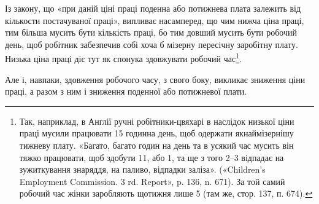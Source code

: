 Із закону, що «при даній ціні праці поденна або потижнева
плата залежить від кількости постачуваної праці», випливає
насамперед, що чим нижча ціна праці, тим більша мусить бути
кількість праці, бо тим довший мусить бути робочий день, щоб
робітник забезпечив собі хоча б мізерну пересічну заробітну плату.
Низька ціна праці діє тут як спонука здовжувати робочий час\footnote{
Так, наприклад, в Англії ручні робітники-цвяхарі в наслідок
низької ціни праці мусили працювати 15 годинна день, щоб одержати якнаймізернішу
тижневу плату. «Багато, багато годин на день та в усякий
час мусить він тяжко працювати, щоб здобути 11, або 1,
та ще з того 2--3 відпадає на зужиткування знаряддя, на паливо,
відпадки заліза». («Children’s Employment Commission. 3 rd. Report», p.
136, n. 671). За той самий робочий час жінки заробляють щотижня
лише 5 (там же, стор. 137, п. 674).
}.

Але і, навпаки, здовження робочого часу, з свого боку, викликає
зниження ціни праці, а разом з ним і зниження поденної
або потижневої плати.

